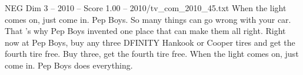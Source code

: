 \begin{textsample}{NEG Dim 3 – 2010 – Score 1.00 – 2010/tv\_com\_2010\_45.txt}  \label{ex:f3_neg_056}
When the light comes on, just come in.
Pep Boys.
So many things can go wrong with your car.
That 's why Pep Boys invented one place that can make them all right.
Right now at Pep Boys, buy any three DFINITY Hankook or Cooper tires and get the fourth tire free.
Buy three, get the fourth tire free.
When the light comes on, just come in.
Pep Boys does everything.

\end{textsample}
